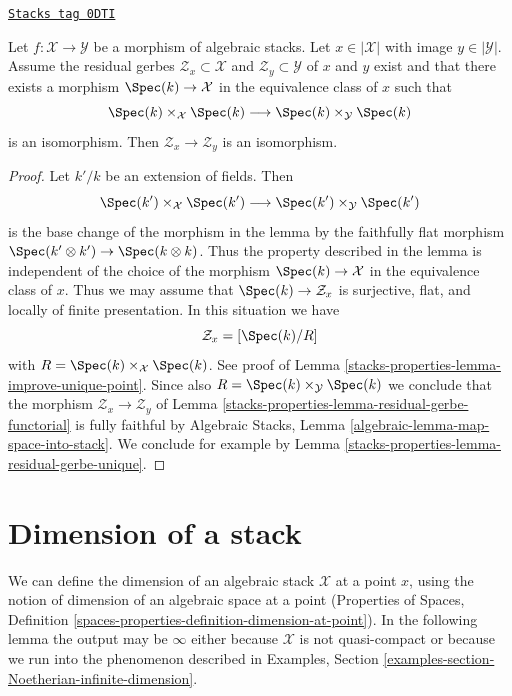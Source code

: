\begin{lemma}
\label{stacks-properties-lemma-residual-gerbe-isomorphic}
\href{https://stacks.math.columbia.edu/tag/0DTI}{\texttt{Stacks tag 0DTI}}

Let $f : \mathcal{X} \to \mathcal{Y}$ be a morphism of algebraic stacks.
Let $x \in |\mathcal{X}|$ with image $y \in |\mathcal{Y}|$.
Assume the residual gerbes $\mathcal{Z}_x \subset \mathcal{X}$
and $\mathcal{Z}_y \subset \mathcal{Y}$ of $x$ and $y$ exist
and that there exists a morphism $\Spec(k) \to \mathcal{X}$
in the equivalence class of $x$ such that
$$
\Spec(k) \times_\mathcal{X} \Spec(k)
\longrightarrow
\Spec(k) \times_\mathcal{Y} \Spec(k)
$$
is an isomorphism. Then $\mathcal{Z}_x \to \mathcal{Z}_y$
is an isomorphism.
\end{lemma}

\begin{proof}
Let $k'/k$ be an extension of fields. Then
$$
\Spec(k') \times_\mathcal{X} \Spec(k')
\longrightarrow
\Spec(k') \times_\mathcal{Y} \Spec(k')
$$
is the base change of the morphism in the lemma by the
faithfully flat morphism $\Spec(k' \otimes k') \to \Spec(k \otimes k)$.
Thus the property described in the lemma is independent of the
choice of the morphism $\Spec(k) \to \mathcal{X}$ in the
equivalence class of $x$. Thus we may assume that
$\Spec(k) \to \mathcal{Z}_x$ is surjective, flat, and
locally of finite presentation. In this situation we have
$$
\mathcal{Z}_x = [\Spec(k)/R]
$$
with $R = \Spec(k) \times_\mathcal{X} \Spec(k)$. See
proof of Lemma \ref{stacks-properties-lemma-improve-unique-point}.
Since also $R = \Spec(k) \times_\mathcal{Y} \Spec(k)$
we conclude that the morphism $\mathcal{Z}_x \to \mathcal{Z}_y$
of Lemma \ref{stacks-properties-lemma-residual-gerbe-functorial}
is fully faithful by
Algebraic Stacks, Lemma \ref{algebraic-lemma-map-space-into-stack}.
We conclude for example by Lemma \ref{stacks-properties-lemma-residual-gerbe-unique}.
\end{proof}

\section{Dimension of a stack}
\label{stacks-properties-section-dimension}
We can define the dimension of an algebraic stack $\mathcal{X}$
at a point $x$, using the notion of dimension of an algebraic space
at a point (Properties of Spaces, Definition
\ref{spaces-properties-definition-dimension-at-point}).
In the following lemma the output may be $\infty$ either because
$\mathcal{X}$ is not quasi-compact or because we run into the
phenomenon described in Examples, Section
\ref{examples-section-Noetherian-infinite-dimension}.

